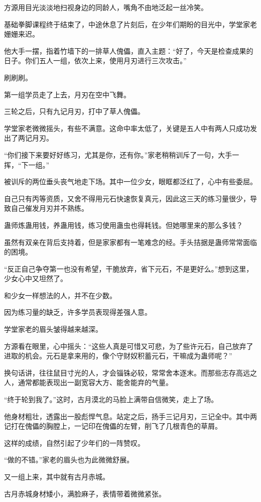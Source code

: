 \begin{this_body}
方源用目光淡淡地扫视身边的同龄人，嘴角不由地泛起一丝冷笑。

基础拳脚课程终于结束了，中途休息了片刻后，在少年们期盼的目光中，学堂家老姗姗来迟。

他大手一摆，指着竹墙下的一排草人傀儡，直入主题：“好了，今天是检查成果的日子。你们五人一组，依次上来，使用月刃进行三次攻击。”

刷刷刷。

第一组学员走了上去，月刃在空中飞舞。

三轮之后，只有九记月刃，打中了草人傀儡。

学堂家老微微摇头，有些不满意。这命中率太低了，关键是五人中有两人只成功发出了两记月刃。

“你们接下来要好好练习，尤其是你，还有你。”家老稍稍训斥了一句，大手一挥，“下一组。”

被训斥的两位垂头丧气地走下场。其中一位少女，眼眶都泛红了，心中有些委屈。

自己只有丙等资质，又舍不得用元石快速恢复真元，因此这三天的练习量很少，导致自己催发月刃并不熟练。

蛊师炼蛊用钱，养蛊用钱，练习使用蛊虫也得耗钱。但她哪里来的那么多钱？

虽然有双亲在背后支持着，但是家家都有一笔难念的经。手头拮据是蛊师常常面临的困境。

“反正自己争夺第一也没有希望，干脆放弃，省下元石，不是更好么。”想到这里，少女心中又坦然了。

和少女一样想法的人，并不在少数。

因为练习量的缺乏，许多学员表现得差强人意。

学堂家老的眉头皱得越来越深。

方源看在眼里，心中摇头：“这些人真是可惜又可悲，为了些许元石，自己放弃了进取的机会。元石是拿来用的，像个守财奴积蓄元石，干嘛成为蛊师呢？”

换句话讲，往往鼠目寸光的人，才会锱铢必较，常常舍本逐末。而那些志存高远之人，通常都能表现出一副宽容大方、能舍能弃的气量。

“终于轮到我了。”这时，古月漠北的马脸上满带自信微笑，走上了场。

他身材粗壮，透露出一股彪悍气息。站定之后，扬手三记月刃，三记全中。其中两记打在傀儡的胸膛上，一记印在傀儡的左臂，削飞了几根青色的草屑。

这样的成绩，自然引起了少年们的一阵赞叹。

“做的不错。”家老的眉头也为此微微舒展。

又一组上来，其中就有古月赤城。

古月赤城身材矮小，满脸麻子，表情带着微微紧张。


\end{this_body}
